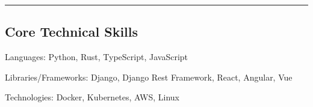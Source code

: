 \documentclass[12pt,letterpaper]{article}
\newenvironment{indentsection}[1]%
{\begin{list}{}%
    {\setlength{\leftmargin}{#1}}%
    \item[]%
}
{\end{list}}
\begin{document}
\hrule
\vspace{-0.4em}
\subsection*{Core Technical Skills}

\begin{indentsection}{\parindent}
    \begin{description*}
        \item[Languages:]
            Python, Rust, TypeScript, JavaScript
        \item[Libraries/Frameworks:]
            Django, Django Rest Framework, React, Angular, Vue
        \item[Technologies:]
            Docker, Kubernetes, AWS, Linux
    \end{description*}
\end{indentsection}
\end{document}
